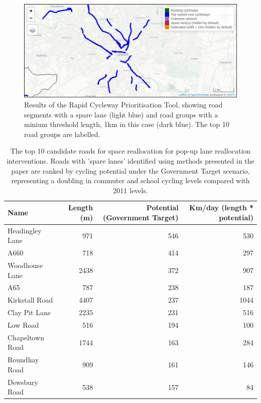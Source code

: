 \documentclass[
]{article}
\begin{document}
\begin{figure}
\includegraphics[width=1\linewidth]{figures/results-top-leeds} \caption{Results of the Rapid Cycleway Prioritisation Tool, showing road segments with a spare lane (light blue) and road groups with a minium threshold length, 1km in this case (dark blue). The top 10 road groups are labelled.}\label{fig:res}
\end{figure}

\begin{table}

\caption{\label{tab:unnamed-chunk-2}The top 10 candidate roads for space reallocation for pop-up lane reallocation interventions. Roads with 'spare lanes' identified using methods presented in the paper are ranked by cycling potential under the Government Target scenario, representing a doubling in commuter and school cycling levels compared with 2011 levels.}
\centering
\begin{tabular}[t]{lrrr}
\toprule
Name & Length (m) & Potential (Government Target) & Km/day (length * potential)\\
\midrule
Headingley Lane & 971 & 546 & 530\\
A660 & 718 & 414 & 297\\
Woodhouse Lane & 2438 & 372 & 907\\
A65 & 787 & 238 & 187\\
Kirkstall Road & 4407 & 237 & 1044\\
\addlinespace
Clay Pit Lane & 2235 & 231 & 516\\
Low Road & 516 & 194 & 100\\
Chapeltown Road & 1744 & 163 & 284\\
Roundhay Road & 909 & 161 & 146\\
Dewsbury Road & 538 & 157 & 84\\
\bottomrule
\end{tabular}
\end{table}
\end{document}
